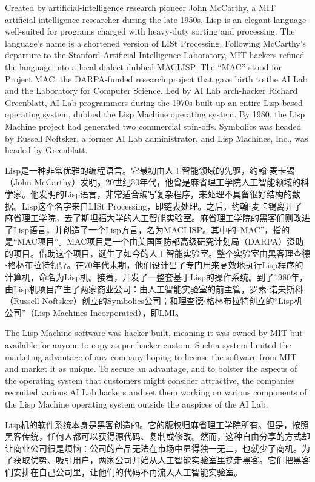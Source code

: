 \ifdefined\vone
\ifdefined\eng
Created by artificial-intelligence research pioneer John McCarthy, a MIT artificial-intelligence researcher during the late 1950s, Lisp is an elegant language well-suited for programs charged with heavy-duty sorting and processing. The language's name is a shortened version of LISt Processing. Following McCarthy's departure to the Stanford Artificial Intelligence Laboratory, MIT hackers refined the language into a local dialect dubbed MACLISP. The ``MAC'' stood for Project MAC, the DARPA-funded research project that gave birth to the AI Lab and the Laboratory for Computer Science. Led by AI Lab arch-hacker Richard Greenblatt, AI Lab programmers during the 1970s built up an entire Lisp-based operating system, dubbed the Lisp Machine operating system. By 1980, the Lisp Machine project had generated two commercial spin-offs. Symbolics was headed by Russell Noftsker, a former AI Lab administrator, and Lisp Machines, Inc., was headed by Greenblatt.
\fi

\ifdefined\chs
Lisp是一种非常优雅的编程语言。它最初由人工智能领域的先驱，约翰⋅麦卡锡（John McCarthy）发明。20世纪50年代，他曾是麻省理工学院人工智能领域的科学家。他发明的Lisp语言，非常适合编写复杂程序，来处理不具备很好结构的数据。Lisp这个名字来自LISt Processing，即链表处理。之后，约翰⋅麦卡锡离开了麻省理工学院，去了斯坦福大学的人工智能实验室。麻省理工学院的黑客们则改进了Lisp语言，并创造了一个Lisp方言，名为MACLISP。其中的``MAC''，指的是``MAC项目''。MAC项目是一个由美国国防部高级研究计划局（DARPA）资助的项目。借助这个项目，诞生了如今的人工智能实验室。整个实验室由黑客理查德⋅格林布拉特领导。在70年代末期，他们设计出了专门用来高效地执行Lisp程序的计算机，命名为Lisp机。接着，开发了一整套基于Lisp的操作系统。到了1980年，由Lisp机项目产生了两家商业公司：由人工智能实验室的前主管，罗素⋅诺夫斯科（Russell Noftsker）创立的Symbolics公司；和理查德⋅格林布拉特创立的``Lisp机公司''（Lisp Machines Incorporated），即LMI。
\fi

\ifdefined\eng
The Lisp Machine software was hacker-built, meaning it was owned by MIT but available for anyone to copy as per hacker custom. Such a system limited the marketing advantage of any company hoping to license the software from MIT and market it as unique. To secure an advantage, and to bolster the aspects of the operating system that customers might consider attractive, the companies recruited various AI Lab hackers and set them working on various components of the Lisp Machine operating system outside the auspices of the AI Lab.
\fi

\ifdefined\chs
Lisp机的软件系统本身是黑客创造的。它的版权归麻省理工学院所有。但是，按照黑客传统，任何人都可以获得源代码、复制或修改。然而，这种自由分享的方式却让商业公司很是烦恼：公司的产品无法在市场中显得独一无二，也就少了商机。为了获取优势、吸引用户，两家公司开始从人工智能实验室里挖走黑客。它们把黑客们安排在自己公司里，让他们的代码不再流入人工智能实验室。
\fi

